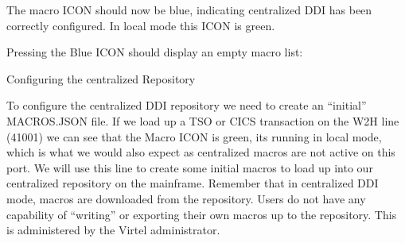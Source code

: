 \documentclass[letterpaper,10pt,english]{sphinxmanual}
\begin{document}
\sphinxAtStartPar
The macro ICON should now be blue, indicating centralized DDI has been correctly configured. In local mode this ICON is green.

\sphinxAtStartPar
{}

\sphinxAtStartPar
{}

\sphinxAtStartPar
Pressing the Blue ICON should display an empty macro list:

\sphinxAtStartPar
{}

\sphinxAtStartPar
{}

\ignorespaces 
\sphinxAtStartPar
Configuring the centralized Repository

\sphinxAtStartPar
To configure the centralized DDI repository we need to create an “initial” MACROS.JSON file. If we load up a TSO or CICS transaction on the W2H line (41001) we can see that the Macro ICON is green, its running in local mode, which is what we would also expect as centralized macros are not active on this port. We will use this line to create some initial macros to load up into our centralized repository on the mainframe. Remember that in centralized DDI mode, macros are downloaded from the repository. Users do not have any capability of “writing” or exporting their own macros up to the repository. This is administered by the Virtel administrator.

\begin{sphinxVerbatim}[commandchars=\\\{\}]
\end{sphinxVerbatim}

\sphinxAtStartPar
{}

\sphinxAtStartPar
{}

\ignorespaces 
\end{document}
